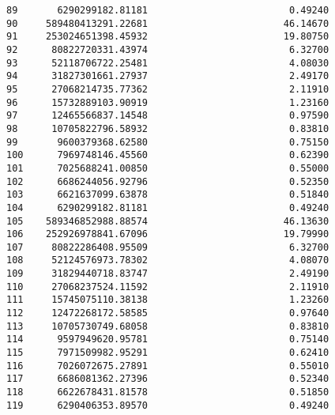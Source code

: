 \documentclass[11pt]{article}
\begin{document}
\begin{tcolorbox}[breakable, size=fbox, boxrule=.5pt, pad at break*=1mm, opacityfill=0]
\begin{Verbatim}[commandchars=\\\{\}]
89       6290299182.81181                         0.49240
90     589480413291.22681                        46.14670
91     253024651398.45932                        19.80750
92      80822720331.43974                         6.32700
93      52118706722.25481                         4.08030
94      31827301661.27937                         2.49170
95      27068214735.77362                         2.11910
96      15732889103.90919                         1.23160
97      12465566837.14548                         0.97590
98      10705822796.58932                         0.83810
99       9600379368.62580                         0.75150
100      7969748146.45560                         0.62390
101      7025688241.00850                         0.55000
102      6686244056.92796                         0.52350
103      6621637099.63878                         0.51840
104      6290299182.81181                         0.49240
105    589346852988.88574                        46.13630
106    252926978841.67096                        19.79990
107     80822286408.95509                         6.32700
108     52124576973.78302                         4.08070
109     31829440718.83747                         2.49190
110     27068237524.11592                         2.11910
111     15745075110.38138                         1.23260
112     12472268172.58585                         0.97640
113     10705730749.68058                         0.83810
114      9597949620.95781                         0.75140
115      7971509982.95291                         0.62410
116      7026072675.27891                         0.55010
117      6686081362.27396                         0.52340
118      6622678431.81578                         0.51850
119      6290406353.89570                         0.49240


\end{Verbatim}
\end{tcolorbox}
\end{document}
